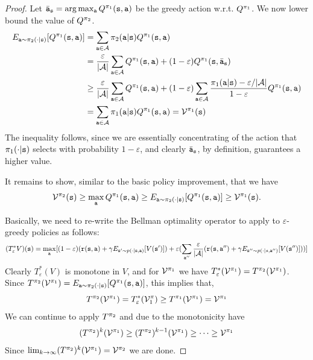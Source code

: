 \begin{proof}
Let $\bar{{\tt a}}_{\tt s}=\arg\max_{\tt a}
Q^{\pi_1}({\tt s},{\tt a})$ be the greedy action w.r.t.
$Q^{\pi_1}$. We now lower bound the value of $Q^{\pi_2}$.
\begin{align*}
E_{{\tt a}\sim\pi_2(\cdot|{\tt s})}[Q^{\pi_1}({\tt s},{\tt a})] &= \sum_{{\tt a} \in \mathcal{A}} \pi_2({\tt a}|{\tt s}) Q^{\pi_1}({\tt s},{\tt a})\\
&= \frac{\varepsilon}{|\mathcal{A}|}\sum_{{\tt a} \in \mathcal{A}}
Q^{\pi_1}({\tt s},{\tt a})+(1-\varepsilon)Q^{\pi_1}({\tt s},\bar{{\tt a}}_{\tt s})\\
&\geq \frac{\varepsilon}{|\mathcal{A}|}\sum_{{\tt a} \in \mathcal{A}}
Q^{\pi_1}({\tt s},{\tt a})+(1-\varepsilon)\sum_{{\tt a} \in
\mathcal{A}}
\frac{\pi_1({\tt a}|{\tt s})-\varepsilon/|\mathcal{A}|}{1-\varepsilon}Q^{\pi_1}({\tt s},{\tt a})\\
&=\sum_{{\tt a} \in \mathcal{A}} \pi_1({\tt a}|{\tt s})Q^{\pi_1}({\tt s},{\tt a})=\mathcal{V}^{\pi_1}({\tt s})\\
\end{align*}
The inequality follows, since we are essentially concentrating of
the action that $\pi_1(\cdot|{\tt s})$ selects with probability
$1-\varepsilon$, and clearly $\bar{{\tt a}}_{\tt s}$, by definition,
guarantees a higher value.

It remains to show, similar to the basic policy improvement, that we have
$$
\mathcal{V}^{\pi_2} ({\tt s})\geq
\max_{\tt a} Q^{\pi_1}({\tt s},{\tt a})\geq
E_{{\tt a}\sim\pi_2(\cdot|{\tt s})}[Q^{\pi_1}({\tt s},{\tt a})]
\geq \mathcal{V}^{\pi_1}({\tt s}).
$$

Basically, we need to re-write the Bellman optimality operator to
apply to $\varepsilon$-greedy policies as follows:
\[
(T^*_\varepsilon V)({\tt s}) = \max_{\tt a}
[(1-\varepsilon)({\tt r}({\tt s},{\tt a})+\gamma E_{{\tt s}'\sim
p(\cdot |{\tt s},{\tt a})}[V({\tt s}')])+ \varepsilon
(\sum_{{\tt a}''}\frac{\varepsilon}{|\mathcal{A}|}({\tt r}({\tt s},{\tt a}'')
+\gamma E_{{\tt s}''\sim p(\cdot |s,{\tt a}'')}[V({\tt s}'')]))]
\]
Clearly $T^*_\varepsilon(V)$ is monotone in $V$, and for
$\mathcal{V}^{\pi_1}$ we have
$T^*_\varepsilon(\mathcal{V}^{\pi_1})=T^{\pi_2}(\mathcal{V}^{\pi_1})$.
Since $ T^{\pi_2}(\mathcal{V}^{\pi_1}) =
E_{{\tt a}\sim\pi_2(\cdot|{\tt s})}[Q^{\pi_1}({\tt s},{\tt a})]$,
this implies that,
\[
T^{\pi_2}(\mathcal{V}^{\pi_1})=T^*_\varepsilon(\mathcal{V}^\pi_1)
\geq T^{\pi_1}(\mathcal{V}^{\pi_1}) = \mathcal{V}^{\pi_1}
\]
We can continue to apply $T^{\pi_2}$ and due to the monotonicity
have
\[
(T^{\pi_2})^k (\mathcal{V}^{\pi_1}) \geq (T^{\pi_2})^{k-1}
(\mathcal{V}^{\pi_1}) \geq \cdots \geq \mathcal{V}^{\pi_1}
\]
Since $\lim_{k\rightarrow \infty}(T^{\pi_2})^k
(\mathcal{V}^{\pi_1}) = \mathcal{V}^{\pi_2}$ we are done.
\end{proof}

